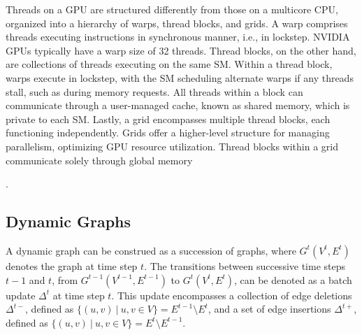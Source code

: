 Threads on a GPU are structured differently from those on a multicore CPU, organized into a hierarchy of warps, thread blocks, and grids. A warp comprises threads executing instructions in synchronous manner, i.e., in lockstep. NVIDIA GPUs typically have a warp size of 32 threads. Thread blocks, on the other hand, are collections of threads executing on the same SM. Within a thread block, warps execute in lockstep, with the SM scheduling alternate warps if any threads stall, such as during memory requests. All threads within a block can communicate through a user-managed cache, known as shared memory, which is private to each SM. Lastly, a grid encompasses multiple thread blocks, each functioning independently. Grids offer a higher-level structure for managing parallelism, optimizing GPU resource utilization. Thread blocks within a grid communicate solely through global memory.





\subsection{Dynamic Graphs}
\label{sec:about-dynamic}

A dynamic graph can be construed as a succession of graphs, where $G^t(V^t, E^t)$ denotes the graph at time step $t$. The transitions between successive time steps $t-1$ and $t$, from $G^{t-1}(V^{t-1}, E^{t-1})$ to $G^t(V^t, E^t)$, can be denoted as a batch update $\Delta^t$ at time step $t$. This update encompasses a collection of edge deletions $\Delta^{t-}$, defined as $\{(u, v)\ |\ u, v \in V\} = E^{t-1} \setminus E^t$, and a set of edge insertions $\Delta^{t+}$, defined as $\{(u, v)\ |\ u, v \in V\} = E^t \setminus E^{t-1}$.







